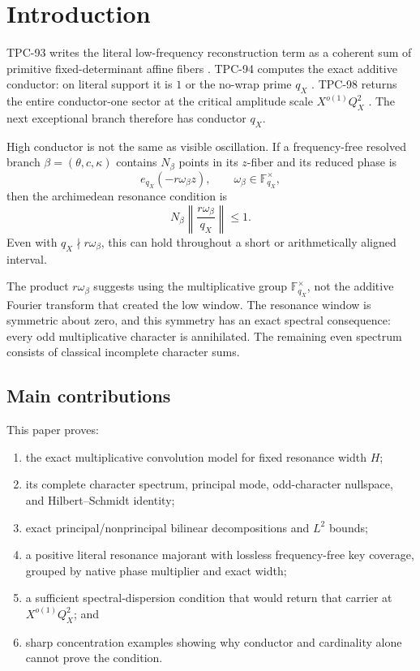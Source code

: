 \section{Introduction}
\label{sec:introduction}

TPC-93 writes the literal low-frequency reconstruction term as a
coherent sum of primitive fixed-determinant affine fibers
\citep{WangTPC93}.  TPC-94 computes the exact additive conductor:
on literal support it is \(1\) or the no-wrap prime \(q_X\)
\citep{WangTPC94}.  TPC-98 returns the entire conductor-one sector at
the critical amplitude scale \(X^{o(1)}Q_X^2\)
\citep{WangTPC98}.  The next exceptional branch therefore has
conductor \(q_X\).

High conductor is not the same as visible oscillation.  If a
frequency-free resolved branch \(\beta=(\theta,c,\kappa)\) contains
\(N_\beta\) points in its \(z\)-fiber and its reduced phase is
\[
 e_{q_X}(-r\omega_\beta z),
 \qquad \omega_\beta\in\mathbb F_{q_X}^{\times},
\]
then the archimedean resonance condition is
\begin{equation}
 N_\beta
 \left\|\frac{r\omega_\beta}{q_X}\right\|
 \le1.
\label{eq:resonance-condition}
\end{equation}
Even with \(q_X\nmid r\omega_\beta\), this can hold throughout a short
or arithmetically aligned interval.

The product \(r\omega_\beta\) suggests using the multiplicative group
\(\mathbb F_{q_X}^{\times}\), not the additive Fourier transform that
created the low window.  The resonance window is symmetric about
zero, and this symmetry has an exact spectral consequence: every
odd multiplicative character is annihilated.  The remaining even
spectrum consists of classical incomplete character sums.

\subsection{Main contributions}

This paper proves:
\begin{enumerate}[leftmargin=2em]
\item the exact multiplicative convolution model for fixed resonance
  width \(H\);
\item its complete character spectrum, principal mode, odd-character
  nullspace, and Hilbert--Schmidt identity;
\item exact principal/nonprincipal bilinear decompositions and
  \(L^2\) bounds;
\item a positive literal resonance majorant with lossless
  frequency-free key coverage, grouped by native phase multiplier
  and exact width;
\item a sufficient spectral-dispersion condition that would return
  that carrier at \(X^{o(1)}Q_X^2\); and
\item sharp concentration examples showing why conductor and
  cardinality alone cannot prove the condition.
\end{enumerate}

